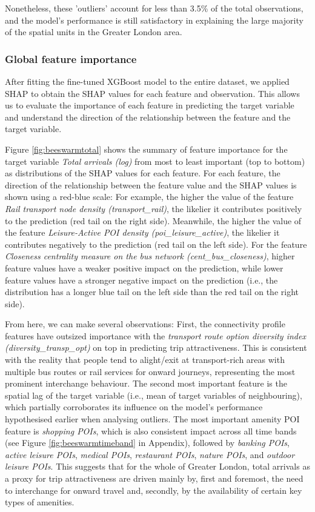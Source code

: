 Nonetheless, these 'outliers' account for less than 3.5\% of the total observations, and the model's performance is still satisfactory in explaining the large majority of the spatial units in the Greater London area. 

\subsubsection*{Global feature importance}

After fitting the fine-tuned XGBoost model to the entire dataset, we applied SHAP to obtain the SHAP values for each feature and observation. This allows us to evaluate the importance of each feature in predicting the target variable and understand the direction of the relationship between the feature and the target variable. 

Figure \ref{fig:beeswarmtotal} shows the summary of feature importance for the target variable \textit{Total arrivals (log)} from most to least important (top to bottom) as distributions of the SHAP values for each feature. For each feature, the direction of the relationship between the feature value and the SHAP values is shown using a red-blue scale: For example, the higher the value of the feature \textit{Rail transport node density (transport\_rail)}, the likelier it contributes positively to the prediction (red tail on the right side). Meanwhile, the higher the value of the feature \textit{Leisure-Active POI density (poi\_leisure\_active)}, the likelier it contributes negatively to the prediction (red tail on the left side). For the feature \textit{Closeness centrality measure on the bus network (cent\_bus\_closeness)}, higher feature values have a weaker positive impact on the prediction, while lower feature values have a stronger negative impact on the prediction (i.e., the distribution has a longer blue tail on the left side than the red tail on the right side).

From here, we can make several observations: First, the connectivity profile features have outsized importance with the \textit{transport route option diversity index (diversity\_transp\_opt)} on top in predicting trip attractiveness. This is consistent with the reality that people tend to alight/exit at transport-rich areas with multiple bus routes or rail services for onward journeys, representing the most prominent interchange behaviour. The second most important feature is the spatial lag of the target variable (i.e., mean of target variables of neighbouring), which partially corroborates its influence on the model's performance hypothesised earlier when analysing outliers. The most important amenity POI feature is \textit{shopping POIs}, which is also consistent impact across all time bands (see Figure \ref{fig:beeswarmtimeband} in Appendix), followed by \textit{banking POIs}, \textit{active leisure POIs}, \textit{medical POIs}, \textit{restaurant POIs}, \textit{nature POIs}, and \textit{outdoor leisure POIs}. This suggests that for the whole of Greater London, total arrivals as a proxy for trip attractiveness are driven mainly by, first and foremost, the need to interchange for onward travel and, secondly, by the availability of certain key types of amenities.

